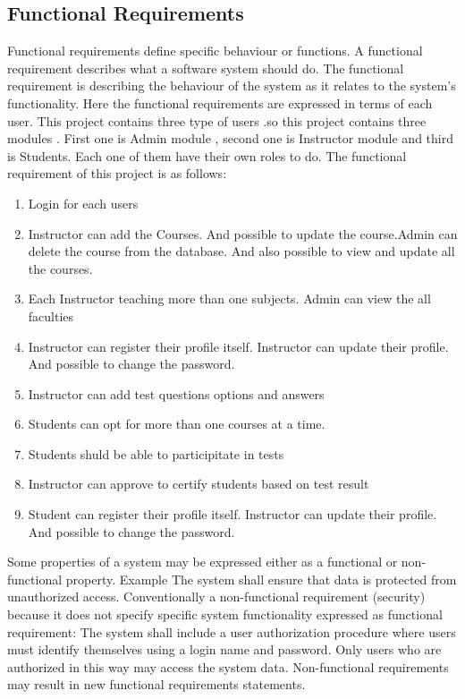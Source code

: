 \subsection{Functional Requirements}
Functional requirements define specific behaviour or functions. A functional requirement describes what a software system should do. The functional requirement is describing the behaviour of the system as it relates to the system's functionality. Here the functional requirements are expressed in terms of each user. This project contains three type of users  .so this project contains three modules . 
 First one is Admin module , second one is Instructor module and third is Students. Each one of them have their own roles to do.
The functional requirement of this project is as follows:
\begin{enumerate}
\item Login  for each users
\item Instructor can add the Courses. And possible to update the course.Admin can delete the course from the database. And also possible to view and update all the courses.
\item Each Instructor teaching more than one subjects. Admin can view the all faculties
\item Instructor can register their profile itself. Instructor can update their profile. And possible to change the password.
\item Instructor can add test questions options and answers
\item Students can opt for more than one courses at a time.
\item Students shuld be able to participitate in tests 
\item Instructor can approve to certify students based on test result
\item Student can register their profile itself. Instructor can update their profile. And possible to change the password.
\end{enumerate}

Some properties of a system may be expressed either as a functional or non-functional property. Example The system shall ensure that data is protected from unauthorized access. Conventionally a non-functional requirement (security) because it does not specify specific system functionality expressed as functional requirement: The system shall include a user authorization procedure where users must identify themselves using a login name and password. Only users who are authorized in this way may access the system data. Non-functional requirements may result in new functional requirements statements.
%
